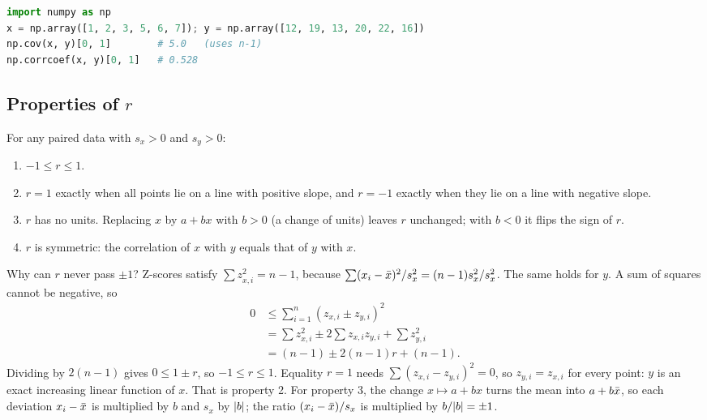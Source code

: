 \begin{lstlisting}[language=Python]
import numpy as np
x = np.array([1, 2, 3, 5, 6, 7]); y = np.array([12, 19, 13, 20, 22, 16])
np.cov(x, y)[0, 1]        # 5.0   (uses n-1)
np.corrcoef(x, y)[0, 1]   # 0.528
\end{lstlisting}

\subsection{Properties of $r$}

\begin{theorem}
\label{thm:corr-props}
For any paired data with $s_x > 0$ and $s_y > 0$:
\begin{enumerate}
  \item $-1 \le r \le 1$.
  \item $r = 1$ exactly when all points lie on a line with positive slope, and
    $r=-1$ exactly when they lie on a line with negative slope.
  \item $r$ has no units. Replacing $x$ by $a + bx$ with $b > 0$ (a change of units)
    leaves $r$ unchanged; with $b<0$ it flips the sign of $r$.
  \item $r$ is symmetric: the correlation of $x$ with $y$ equals that of $y$ with $x$.
\end{enumerate}
\end{theorem}

\begin{whybox}
Why can $r$ never pass $\pm 1$? Z-scores satisfy $\sum z_{x,i}^2 = n-1$, because
$\sum (x_i-\bar{x})^2 / s_x^2 = (n-1)s_x^2/s_x^2$. The same holds for $y$. A sum of
squares cannot be negative, so
\begin{align*}
  0 &\le \sum_{i=1}^n (z_{x,i} \pm z_{y,i})^2 \\
    &= \sum z_{x,i}^2 \pm 2\sum z_{x,i}z_{y,i} + \sum z_{y,i}^2 \\
    &= (n-1) \pm 2(n-1)r + (n-1).
\end{align*}
Dividing by $2(n-1)$ gives $0 \le 1 \pm r$, so $-1 \le r \le 1$. Equality $r = 1$
needs $\sum(z_{x,i} - z_{y,i})^2 = 0$, so $z_{y,i} = z_{x,i}$ for every point:
$y$ is an exact increasing linear function of $x$. That is property 2. For
property 3, the change $x \mapsto a + bx$ turns the mean into $a + b\bar{x}$, so each
deviation $x_i - \bar{x}$ is multiplied by $b$ and $s_x$ by $\lvert b\rvert$; the ratio
$(x_i-\bar{x})/s_x$ is multiplied by $b/\lvert b\rvert = \pm 1$.
\end{whybox}

